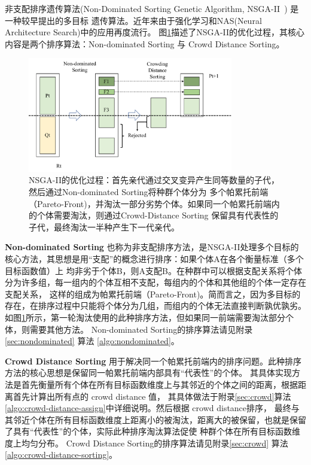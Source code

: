 非支配排序遗传算法(Non-Dominated Sorting Genetic Algorithm, NSGA-II~\cite{deb2002fast}) 是一种较早提出的多目标
遗传算法。近年来由于强化学习\cite{li2019deep}和NAS(Neural Architecture Search)\cite{lu2019nsga}中的应用再度流行。
图\ref{fig:NSGA-II}描述了NSGA-II的优化过程，其核心内容是两个排序算法：Non-dominated Sorting 与 Crowd Distance Sorting。

\begin{figure}[h]
	\centering
	\includegraphics[width=0.8\textwidth]{figure/NSGA-II}
	\caption{NSGA-II的优化过程：首先亲代通过交叉变异产生同等数量的子代，然后通过Non-dominated Sorting将种群个体分为
	多个帕累托前端（Pareto-Front)，并淘汰一部分劣势个体。如果同一个帕累托前端内的个体需要淘汰，则通过Crowd-Distance Sorting
	保留具有代表性的子代，最终淘汰一半种产生下一代亲代。} 
	\label{fig:NSGA-II}
\end{figure}

{\bf Non-dominated Sorting}
也称为非支配排序方法，是NSGA-II处理多个目标的核心方法，其思想是用“支配”的概念进行排序：如果个体A在各个衡量标准（多个目标函数值）上
均非劣于个体B，则A支配B。在种群中可以根据支配关系将个体分为许多组，每一组内的个体互相不支配，每组内的个体和其他组的个体一定存在支配关系，
这样的组成为帕累托前端（Pareto-Front)。简而言之，因为多目标的存在，在排序过程中只能将个体分为几组，而组内的个体无法直接判断孰优孰劣。
如图\ref{fig:NSGA-II}所示，第一轮淘汰使用的此种排序方法，但如果同一前端需要淘汰部分个体，则需要其他方法。
Non-dominated Sorting的排序算法请见附录\ref{sec:nondominated} 算法 \ref{algo:nondominated}。


{\bf Crowd Distance Sorting}
用于解决同一个帕累托前端内的排序问题。此种排序方法的核心思想是保留同一帕累托前端内部具有“代表性”的个体。
其具体实现方法是首先衡量所有个体在所有目标函数维度上与其邻近的个体之间的距离，根据距离首先计算出所有点的 crowd distance 值，
其具体做法于附录\ref{sec:crowd}算法 \ref{algo:crowd-distance-assign}中详细说明。然后根据 crowd distance排序，
最终与其邻近个体在所有目标函数维度上距离小的被淘汰，距离大的被保留，也就是保留了具有“代表性”的个体，实际此种排序淘汰算法促使
种群个体在所有目标函数维度上均匀分布。
Crowd Distance Sorting的排序算法请见附录\ref{sec:crowd} 算法 \ref{algo:crowd-distance-sorting}。



